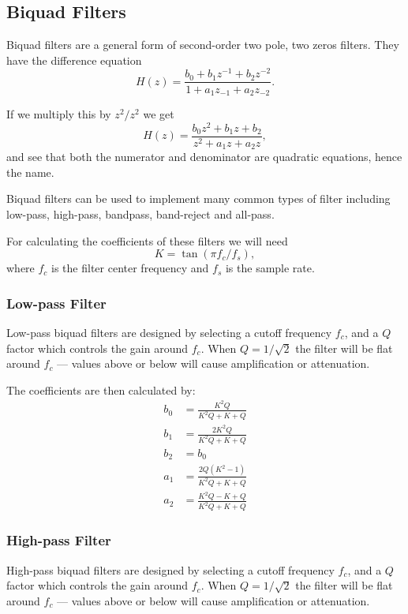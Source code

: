 \documentclass[11pt]{article}
\begin{document}
\subsection{Biquad Filters}
Biquad filters are a general form of second-order two pole, two zeros filters. They have the difference equation
\begin{equation}
    H(z) = \frac{b_0 + b_1 z^{-1} + b_2 z ^{-2}}{1 + a_1 z_{-1} + a_2 z_{-2}}.
\end{equation}

If we multiply this by $z^2 / z^2$ we get
\begin{equation}
    H(z) = \frac{b_0 z^2 + b_1 z + b_2}{z^2 + a_1 z + a_2 z},
\end{equation}
and see that both the numerator and denominator are quadratic equations, hence the name.

Biquad filters can be used to implement many common types of filter including low-pass, high-pass, bandpass, band-reject and all-pass.

For calculating the coefficients of these filters we will need
\begin{equation}
    K = \tan (\pi f_c / f_s),
\end{equation}
where $f_c$ is the filter center frequency and $f_s$ is the sample rate.

\subsubsection{Low-pass Filter}
Low-pass biquad filters are designed by selecting a cutoff frequency $f_c$, and a $Q$ factor which controls the gain around $f_c$.
When $Q = 1/\sqrt 2$ the filter will be flat around $f_c$ --- values above or below will cause amplification or attenuation.

The coefficients are then calculated by:
\begin{align}
    b_0 &= \frac{K^2Q}{K^2Q + K + Q}\\
    b_1 &= \frac{2K^2Q}{K^2Q + K + Q}\\
    b_2 &= b_0\\
    a_1 &= \frac{2Q(K^2 - 1)}{K^2Q + K + Q}\\
    a_2 &= \frac{K^2Q - K + Q}{K^2Q + K + Q}
\end{align}
\cite{Zolzer:2011}

\subsubsection{High-pass Filter}
High-pass biquad filters are designed by selecting a cutoff frequency $f_c$, and a $Q$ factor which controls the gain around $f_c$.
When $Q = 1/\sqrt 2$ the filter will be flat around $f_c$ --- values above or below will cause amplification or attenuation.
\end{document}
